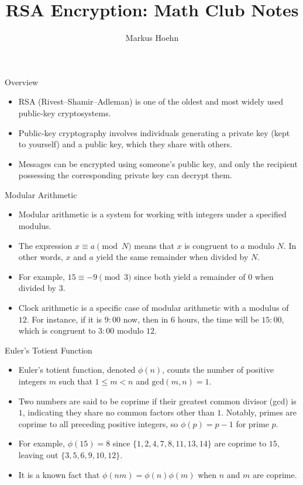 \documentclass{beamer}
\title{RSA Encryption: Math Club Notes}
\author{Markus Hoehn}
\date{}
\begin{document}
\begin{frame}
    \titlepage
\end{frame}


\begin{frame}{Overview}
    \begin{itemize}
    \item RSA (Rivest–Shamir–Adleman) is one of the oldest and most widely used public-key cryptosystems.
    \item Public-key cryptography involves individuals generating a private key (kept to yourself) and a public key, which they share with others.
    \item Messages can be encrypted using someone's public key, and only the recipient possessing the corresponding private key can decrypt them.
    \end{itemize}
\end{frame}

\begin{frame}{Modular Arithmetic}
    \begin{itemize}
        \item Modular arithmetic is a system for working with integers under a specified modulus.
        \item The expression $x \equiv a \pmod{N}$ means that $x$ is congruent to $a$ modulo $N$. In other words, $x$ and $a$ yield the same remainder when divided by $N$.
        \item For example, $15 \equiv -9 \pmod{3}$ since both yield a remainder of $0$ when divided by $3$.
        \item Clock arithmetic is a specific case of modular arithmetic with a modulus of $12$. For instance, if it is $9:00$ now, then in $6$ hours, the time will be $15:00$, which is congruent to $3:00$ modulo $12$.
    \end{itemize}
\end{frame}

\begin{frame}{Euler's Totient Function}
    \begin{itemize}
        \item Euler's totient function, denoted $\phi(n)$, counts the number of positive integers $m$ such that $1 \leq m < n$ and $\text{gcd}(m, n) = 1$.
        \item Two numbers are said to be coprime if their greatest common divisor (gcd) is $1$, indicating they share no common factors other than $1$. Notably, primes are coprime to all preceding positive integers, so $\phi(p) = p - 1$ for prime $p$.
        \item For example, $\phi(15) = 8$ since $\{1, 2, 4, 7, 8, 11, 13, 14\}$ are coprime to $15$, leaving out $\{3, 5, 6, 9, 10, 12\}$.
        \item It is a known fact that $\phi(nm) = \phi(n)\phi(m)$ when $n$ and $m$ are coprime.
    \end{itemize}
\end{frame}
\end{document}
